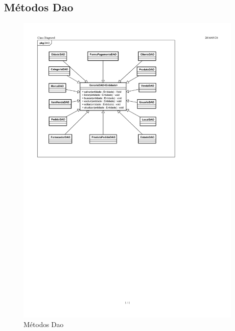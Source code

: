 \documentclass[chapter=TITLE,12pt,oneside,a4paper,english,french,sumario=tradicional,spanish,brazil,]{abntex2}
\begin{document}
\subsection{Métodos Dao}
\begin{figure}[h]\centering
	\includegraphics[scale=1.45]{metodo-dao.pdf}\caption{Métodos Dao}
\end{figure}

\newpage
\end{document}
